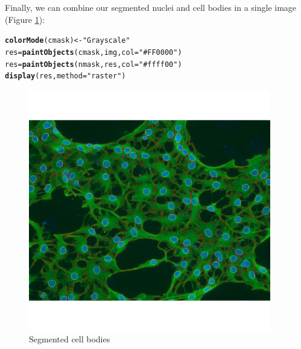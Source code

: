 \documentclass{article}\usepackage[]{graphicx}\usepackage[]{color}
\makeatletter
\newcommand{\hlstr}[1]{\textcolor[rgb]{0.192,0.494,0.8}{#1}}%
\newcommand{\hlstd}[1]{\textcolor[rgb]{0.345,0.345,0.345}{#1}}%
\newcommand{\hlkwb}[1]{\textcolor[rgb]{0.69,0.353,0.396}{#1}}%
\newcommand{\hlkwc}[1]{\textcolor[rgb]{0.333,0.667,0.333}{#1}}%
\newcommand{\hlkwd}[1]{\textcolor[rgb]{0.737,0.353,0.396}{\textbf{#1}}}%
\newenvironment{kframe}{%
 \def\at@end@of@kframe{}%
 \ifinner\ifhmode%
  \def\at@end@of@kframe{\end{minipage}}%
  \begin{minipage}{\columnwidth}%
 \fi\fi%
 \def\FrameCommand##1{\hskip\@totalleftmargin \hskip-\fboxsep
 \colorbox{shadecolor}{##1}\hskip-\fboxsep
     \hskip-\linewidth \hskip-\@totalleftmargin \hskip\columnwidth}%
 \MakeFramed {\advance\hsize-\width
   \@totalleftmargin\z@ \linewidth\hsize
   \@setminipage}}%
 {\par\unskip\endMakeFramed%
 \at@end@of@kframe}
\newenvironment{knitrout}{}{} %
\makeatother
\begin{document}
Finally, we can combine our segmented nuclei and cell bodies in a single image (Figure \ref{fig:res}):
\begin{knitrout}
\color{fgcolor}\begin{kframe}
\begin{alltt}
\hlkwd{colorMode}\hlstd{(cmask)} \hlkwb{<-} \hlstr{"Grayscale"}
\hlstd{res} \hlkwb{=} \hlkwd{paintObjects}\hlstd{(cmask, img,} \hlkwc{col}\hlstd{=}\hlstr{"#FF0000"}\hlstd{)}
\hlstd{res} \hlkwb{=} \hlkwd{paintObjects}\hlstd{(nmask, res,} \hlkwc{col}\hlstd{=}\hlstr{"#ffff00"}\hlstd{)}
\hlkwd{display}\hlstd{(res,} \hlkwc{method}\hlstd{=}\hlstr{"raster"}\hlstd{)}
\end{alltt}
\end{kframe}\begin{figure}

{\centering \includegraphics[width=400px]{knit_figure/figres-1} 

}

\caption[Segmented cell bodies]{Segmented cell bodies}\label{fig:res}
\end{figure}


\end{knitrout}
\end{document}
